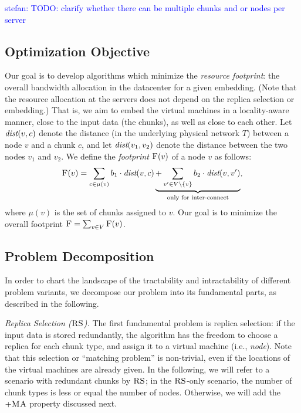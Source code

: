\documentclass[9pt,twocolumn]{scrartcl}
\newcommand{\stefan}[1]{\textcolor{blue}{stefan: #1}}
\newcommand{\VirtualNodes}{\ensuremath{V}}
\newcommand{\achunk}{\ensuremath{c}}
\newcommand{\dist}{\emph{dist}}
\newcommand{\RS}{\textsc{RS}}
\newcommand{\MA}{\textsc{MA}}
\newcommand{\Cost}{\textsc{F}}
\newcommand{\Tree}{\ensuremath{T}}
\newcommand{\CostTrans}{\ensuremath{b_1}}
\newcommand{\CostCom}{\ensuremath{b_2}}
\begin{document}
\stefan{TODO: clarify whether there can be multiple chunks and or nodes per server}


\subsection{Optimization Objective}

Our goal is to develop algorithms which minimize
the \emph{resource footprint}: the overall bandwidth allocation in the datacenter for a given embedding. (Note that
the resource allocation at the servers does not depend on the replica selection or embedding.) That is,
we aim to embed the virtual machines in a locality-aware manner, close to the input data
(the chunks), as well as close to
each other. Let $\dist(v,\achunk)$ denote the distance (in the underlying physical network $\Tree$) between a node $v$ and a
chunk $\achunk$, and let $\dist(v_1,v_2)$ denote the distance between the two nodes $v_1$ and $v_2$.
We define the \emph{footprint} $\Cost(v)$ of a node $v$ as follows:
$$
\Cost(v) = \sum_{\achunk\in \mu(v)} \CostTrans \cdot \dist(v,\achunk) \underbrace{+ \sum_{v' \in \VirtualNodes\setminus\{v\}} \CostCom \cdot \dist(v,v')}_{\text{only for inter-connect}},
$$
\noindent where $\mu(v)$ is the set of chunks assigned to $v$. Our goal is to minimize the overall footprint
$\Cost=\sum_{v\in V} \Cost(v)$.


\subsection{Problem Decomposition}

In order to chart the landscape of the tractability and intractability of different
problem variants, we decompose our problem into its fundamental parts, as described in the following.

\emph{Replica Selection ($\RS$).} The first fundamental problem is replica selection:
if the input data is stored redundantly, the algorithm has the freedom to choose a replica
for each chunk type, and assign it to a virtual machine (i.e., \emph{node}). Note that this
selection or ``matching problem'' is non-trivial, even if the locations of the virtual machines
are already given. In the following, we will refer to a scenario
with redundant chunks by $\RS$; in the $\RS$-only scenario, the number of chunk types
is less or equal the number of nodes. Otherwise, we will add the $+\MA$ property discussed next.
\end{document}
